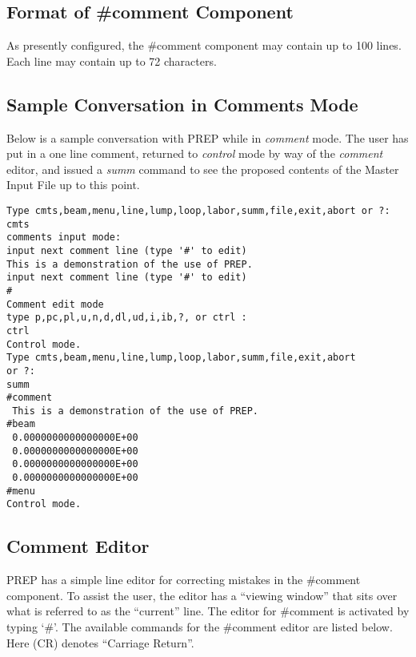 \subsection{Format of \#comment Component} As presently configured, the
\#comment component may contain up to 100 lines. Each line may contain up
to 72 characters.

\subsection{Sample Conversation in Comments Mode} Below is a sample
conversation with PREP while in {\em comment} mode. The user has put in a
one line comment, returned to {\em control} mode by way of the {\em
comment} editor, and issued a {\em summ} command to see the proposed
contents of the Master Input File up to this point.
\begin{footnotesize}
\begin{verbatim}
Type cmts,beam,menu,line,lump,loop,labor,summ,file,exit,abort or ?:
cmts
comments input mode:
input next comment line (type '#' to edit)
This is a demonstration of the use of PREP.
input next comment line (type '#' to edit)
#
Comment edit mode
type p,pc,pl,u,n,d,dl,ud,i,ib,?, or ctrl :
ctrl
Control mode.
Type cmts,beam,menu,line,lump,loop,labor,summ,file,exit,abort
or ?:
summ
#comment
 This is a demonstration of the use of PREP.
#beam
 0.0000000000000000E+00
 0.0000000000000000E+00
 0.0000000000000000E+00
 0.0000000000000000E+00
#menu
Control mode.
\end{verbatim}
\end{footnotesize}

\subsection{Comment Editor} PREP has a simple line editor for correcting
mistakes in the \#comment component. To assist the user, the editor has a
``viewing window'' that sits over what is referred to as the ``current''
line. The editor for \#comment is activated by typing `\#'. The available
commands for the \#comment editor are listed below. Here (CR) denotes
``Carriage Return''.

